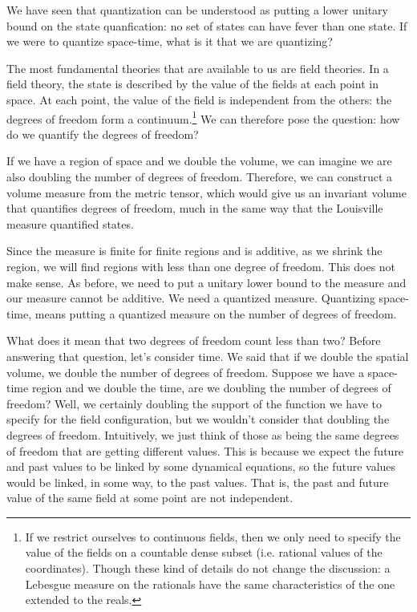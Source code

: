 \documentclass[10pt,twocolumn, nofootinbib]{revtex4-2}
\begin{document}
We have seen that quantization can be understood as putting a lower unitary bound on the state quanfication: no set of states can have fever than one state. If we were to quantize space-time, what is it that we are quantizing?

The most fundamental theories that are available to us are field theories. In a field theory, the state is described by the value of the fields at each point in space. At each point, the value of the field is independent from the others: the degrees of freedom form a continuum.\footnote{If we restrict ourselves to continuous fields, then we only need to specify the value of the fields on a countable dense subset (i.e. rational values of the coordinates). Though these kind of details do not change the discussion: a Lebesgue measure on the rationals have the same characteristics of the one extended to the reals.} We can therefore pose the question: how do we quantify the degrees of freedom?

If we have a region of space and we double the volume, we can imagine we are also doubling the number of degrees of freedom. Therefore, we can construct a volume measure from the metric tensor, which would give us an invariant volume that quantifies degrees of freedom, much in the same way that the Louisville measure quantified states.

Since the measure is finite for finite regions and is additive, as we shrink the region, we will find regions with less than one degree of freedom. This does not make sense. As before, we need to put a unitary lower bound to the measure and our measure cannot be additive. We need a quantized measure. Quantizing space-time, means putting a quantized measure on the number of degrees of freedom.

What does it mean that two degrees of freedom count less than two? Before answering that question, let's consider time. We said that if we double the spatial volume, we double the number of degrees of freedom. Suppose we have a space-time region and we double the time, are we doubling the number of degrees of freedom? Well, we certainly doubling the support of the function we have to specify for the field configuration, but we wouldn't consider that doubling the degrees of freedom. Intuitively, we just think of those as being the same degrees of freedom that are getting different values. This is because we expect the future and past values to be linked by some dynamical equations, so the future values would be linked, in some way, to the past values. That is, the past and future value of the same field at some point are not independent.
\end{document}
